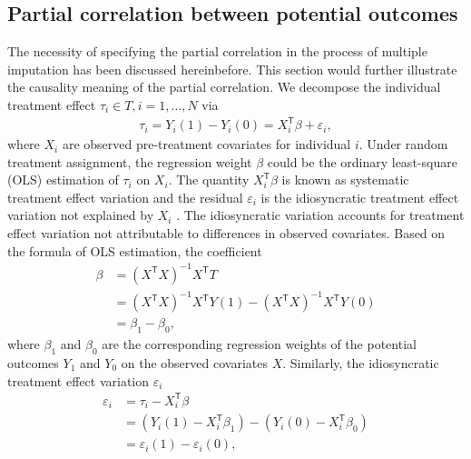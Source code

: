 	\subsection{Partial correlation between potential outcomes}
	The necessity of specifying the partial correlation in the process of multiple imputation has been discussed hereinbefore. This section would further illustrate the causality meaning of the partial correlation. We decompose the individual treatment effect $\tau_{i} \in T, i = 1, \dots, N$ via
	\begin{equation}
		\begin{array}{lr}
			\tau_{i} = Y_{i}(1) - Y_{i}(0) = X_{i}^{\mathsf{T}}\beta + \varepsilon_{i},
		\end{array}
	\end{equation}
	where $X_{i}$ are observed pre-treatment covariates for individual $i$. Under random treatment assignment, the regression weight $\beta$ could be the ordinary least-square (OLS) estimation of $\tau_{i}$ on $X_{i}$. The quantity $X_{i}^{\mathsf{T}}\beta$ is known as systematic treatment effect variation and the residual $\varepsilon_{i}$ is the idiosyncratic treatment effect variation not explained by $X_{i}$ \citep{ding2019decomposing, heckman1997making, djebbari2008heterogeneous}. The idiosyncratic variation accounts for treatment effect variation not attributable to differences in observed covariates. Based on the formula of OLS estimation, the coefficient 
	\begin{equation}
		\begin{array}{cl}
			\beta &= (X^{\mathsf{T}}X)^{-1}X^{\mathsf{T}}T \\
			&= (X^{\mathsf{T}}X)^{-1}X^{\mathsf{T}}Y(1) - (X^{\mathsf{T}}X)^{-1}X^{\mathsf{T}}Y(0) \\
			&= \beta_{1} -\beta_{0},
		\end{array}
	\end{equation}
	where $\beta_{1}$ and $\beta_{0}$ are the corresponding regression weights of the potential outcomes $Y_{1}$ and $Y_{0}$ on the observed covariates $X$. Similarly, the idiosyncratic treatment effect variation $\varepsilon_{i}$
	\begin{equation}
		\begin{array}{cl}
			\varepsilon_{i} &= \tau_{i} - X_{i}^{\mathsf{T}}\beta\\
			&= (Y_{i}(1)  - X_{i}^{\mathsf{T}}\beta_{1}) - (Y_{i}(0) - X_{i}^{\mathsf{T}}\beta_{0})\\
			&= \varepsilon_{i}(1) -\varepsilon_{i}(0),
		\end{array}
	\end{equation} 
